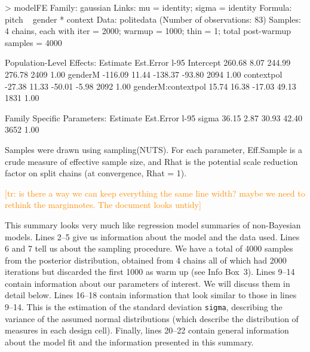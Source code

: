 \documentclass[nobib]{tufte-handout}
\newcommand{\tr}[1]{\textcolor{DarkOrange}{[tr: #1]}}
\begin{document}
\begin{minipage}[]{1.2\textwidth}
\begin{rc}
> modelFE
 Family: gaussian 
  Links: mu = identity; sigma = identity 
Formula: pitch ~ gender * context 
   Data: politedata (Number of observations: 83) 
Samples: 4 chains, each with iter = 2000; warmup = 1000; thin = 1;
         total post-warmup samples = 4000

Population-Level Effects: 
                   Estimate Est.Error l-95%
Intercept            260.68      8.07   244.99   276.78       2409 1.00
genderM             -116.09     11.44  -138.37   -93.80       2094 1.00
contextpol           -27.38     11.33   -50.01    -5.98       2092 1.00
genderM:contextpol    15.74     16.38   -17.03    49.13       1831 1.00

Family Specific Parameters: 
      Estimate Est.Error l-95%
sigma    36.15      2.87    30.93    42.40       3652 1.00

Samples were drawn using sampling(NUTS). For each parameter, Eff.Sample 
is a crude measure of effective sample size, and Rhat is the potential 
scale reduction factor on split chains (at convergence, Rhat = 1).
\end{rc}
\end{minipage}

\tr{is there a way we can keep everything the same line width? maybe we need to rethink the marginnotes. The document looks untidy}

\medskip

This summary looks very much like regression model summaries of non-Bayesian models. Lines 2--5
give us information about the model and the data used. Lines 6 and 7 tell us about the sampling
procedure. We have a total of 4000 samples from the posterior distribution, obtained from 4
chains all of which had 2000 iterations but discarded the first 1000 as warm up (see Info Box~3). Lines 9--14 contain information about our parameters of interest. We will discuss them in detail below. Lines 16--18 contain information that look similar to those in lines 9--14. This is the estimation of the standard deviation \texttt{sigma}, describing the variance of the assumed normal distributions (which describe the distribution of measures in each design cell). Finally, lines 20--22 contain general information about the model fit and the information presented in this summary.
\end{document}
